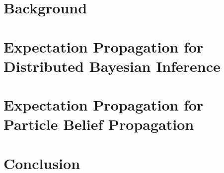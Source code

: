 \chapter{Background}

\ifbgm\fi

\chapter[EP for Distributed Bayesian Inference]{\label{chap:EPforDBI}Expectation Propagation for\\ Distributed Bayesian Inference}
\ifsnep\fi

\chapter[EPBP]{\label{chap:EPBP}Expectation Propagation for\\ Particle Belief Propagation}

\ifpbp\fi


\chapter{Conclusion}

\ifccl\fi


\begin{appendices}
\chapter{}


\end{appendices}



\newpage
\renewcommand{\bibname}{References}

\singlespacing
\begin{footnotesize}

\end{footnotesize}


